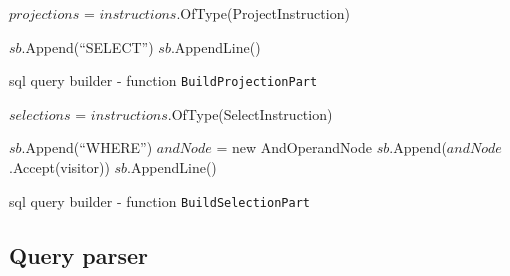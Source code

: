 \begin{algorithm}[!htp]
    \footnotesize
    \DontPrintSemicolon

    

    $projections$ = $instructions$.OfType(ProjectInstruction)\;


    $sb$.Append(``SELECT'')\;
    $sb$.AppendLine()\;
    
    \caption{\acrshort{sql}  query builder - function \texttt{BuildProjectionPart}}
    \label{alg:query_builder_buildprojection}
\end{algorithm}

\begin{algorithm}[!htp]
    \footnotesize
    \DontPrintSemicolon

    

    $selections$ = $instructions$.OfType(SelectInstruction)\;


    $sb$.Append(``WHERE'')\;
    $andNode$ = new AndOperandNode\;
    $sb$.Append($andNode$.Accept(visitor))\;
    $sb$.AppendLine()\;
    \caption{\acrshort{sql}  query builder - function \texttt{BuildSelectionPart}}
    \label{alg:query_builder_build_selection}
\end{algorithm}

\subsection{Query parser}



